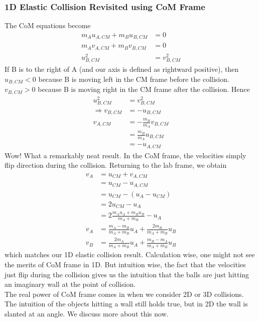 \documentclass{article}
\begin{document}
\subsubsection{1D Elastic Collision Revisited using CoM Frame}
The CoM equations become
\begin{align}
    m_A u_{A,CM} + m_B u_{B,CM} &= 0 \\
    m_A v_{A,CM} + m_B v_{B,CM} &= 0 \\
    u_{B,CM}^2 &= v_{B,CM}^2 
\end{align}
If B is to the right of A (and our axis is defined as rightward positive), then $u_{B,CM} < 0$ because B is moving left in the CM frame before the collision. $v_{B,CM} > 0$ because B is moving right in the CM frame after the collision. Hence 
\begin{align}
    u_{B,CM}^2 &= v_{B,CM}^2 \\
    \Rightarrow v_{B,CM} &= -u_{B,CM} \\
    v_{A,CM} &= -\frac{m_B}{m_A} v_{B,CM} \\ 
    &= \frac{m_B}{m_A} u_{B,CM} \\
    &= - u_{A,CM}
\end{align}
Wow! What a remarkably neat result. In the CoM frame, the velocities simply flip direction during the collision. Returning to the lab frame, we obtain 
\begin{align}
    v_A &= u_{CM} + v_{A,CM} \\
    &= u_{CM} - u_{A,CM} \\
    &= u_{CM} - (u_A - u_{CM}) \\
    &= 2 u_{CM} - u_A \\
    &= 2 \frac{m_A u_A + m_B u_B}{m_A + m_B} - u_A\\
    v_A &= \frac{m_A - m_B}{m_A + m_B} u_A + \frac{2m_B}{m_A + m_B} u_B \\
    v_B &= \frac{2m_A}{m_A + m_B} u_A + \frac{m_B - m_A}{m_A + m_B} u_B
\end{align}
which matches our 1D elastic collision result. Calculation wise, one might not see the merits of CoM frame in 1D. But intuition wise, the fact that the velocities just flip during the collision gives us the intuition that the balls are just hitting an imaginary wall at the point of collision. \\[10pt]
The real power of CoM frame comes in when we consider 2D or 3D collisions. The intuition of the objects hitting a wall still holds true, but in 2D the wall is slanted at an angle. We discuss more about this now.
\end{document}

